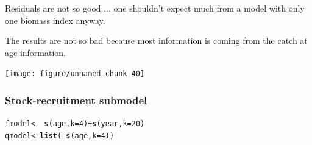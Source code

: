 \documentclass[a4paper,english,10pt]{article}\usepackage[]{graphicx}\usepackage[]{color}
\makeatletter
\newcommand{\hlnum}[1]{\textcolor[rgb]{0.686,0.059,0.569}{#1}}%
\newcommand{\hlopt}[1]{\textcolor[rgb]{0,0,0}{#1}}%
\newcommand{\hlstd}[1]{\textcolor[rgb]{0.345,0.345,0.345}{#1}}%
\newcommand{\hlkwb}[1]{\textcolor[rgb]{0.69,0.353,0.396}{#1}}%
\newcommand{\hlkwc}[1]{\textcolor[rgb]{0.333,0.667,0.333}{#1}}%
\newcommand{\hlkwd}[1]{\textcolor[rgb]{0.737,0.353,0.396}{\textbf{#1}}}%
\newenvironment{kframe}{%
 \def\at@end@of@kframe{}%
 \ifinner\ifhmode%
  \def\at@end@of@kframe{\end{minipage}}%
  \begin{minipage}{\columnwidth}%
 \fi\fi%
 \def\FrameCommand##1{\hskip\@totalleftmargin \hskip-\fboxsep
 \colorbox{shadecolor}{##1}\hskip-\fboxsep
     \hskip-\linewidth \hskip-\@totalleftmargin \hskip\columnwidth}%
 \MakeFramed {\advance\hsize-\width
   \@totalleftmargin\z@ \linewidth\hsize
   \@setminipage}}%
 {\par\unskip\endMakeFramed%
 \at@end@of@kframe}
\newenvironment{knitrout}{}{} %
\makeatother
\begin{document}
Residuals are not so good ... one shouldn't expect much from a model with only one biomass index anyway. 


The results are not so bad because most information is coming from the catch at age information.

\begin{knitrout}
\color{fgcolor}

{\centering \texttt{[image: figure/unnamed-chunk-40]} 

}



\end{knitrout}


\subsubsection{Stock-recruitment submodel}

\begin{knitrout}
\color{fgcolor}\begin{kframe}
\begin{alltt}
\hlstd{fmodel} \hlkwb{<-} \hlopt{~}\hlkwd{s}\hlstd{(age,} \hlkwc{k} \hlstd{=} \hlnum{4}\hlstd{)} \hlopt{+} \hlkwd{s}\hlstd{(year,} \hlkwc{k} \hlstd{=} \hlnum{20}\hlstd{)}
\hlstd{qmodel} \hlkwb{<-} \hlkwd{list}\hlstd{(}\hlopt{~}\hlkwd{s}\hlstd{(age,} \hlkwc{k} \hlstd{=} \hlnum{4}\hlstd{))}
\end{alltt}
\end{kframe}
\end{knitrout}
\end{document}
